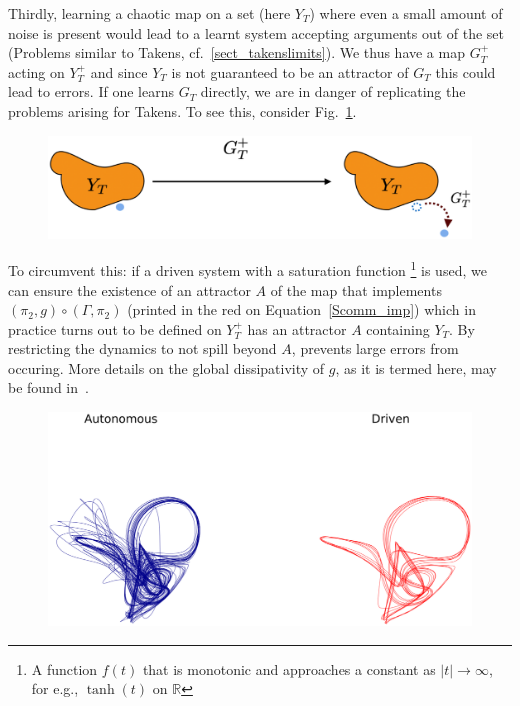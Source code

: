 
Thirdly, learning a chaotic map on a set (here $Y_T$) where even a small amount of noise is present would lead to a learnt system accepting arguments out of the set (Problems similar to Takens, cf.~\ref{sect_takenslimits}). 
We thus have a map $G_T^+$ acting on $Y_T^+$ and since $Y_T$ is not guaranteed to be an attractor of $G_T$ this could lead to errors.
If one learns $G_T$ directly, we are in danger of replicating the problems arising for Takens.  To see this, consider Fig.~\ref{fig:YtGtFailure}.

\begin{figure}[ht]
  \includegraphics[width=0.6\linewidth]{Graphs/_YTerrors.eps}
  \centering
\label{fig:YtGtFailure}
\end{figure}

To circumvent this: if a driven system with a saturation function \footnote{A function $f(t)$ that is monotonic and approaches a constant as $|t|\to \infty$, for e.g., $\tanh(t)$ on $\mathbb{R}$} is used, we can ensure the existence of an attractor $A$ of the map that implements 
$(\pi_2,g) \circ (\Gamma,\pi_2)$ (printed in the red on Equation~\ref{Scomm_imp})
 which in practice turns out to be defined on $Y_T^+$ has an attractor $A$  containing $Y_T$.
By restricting the dynamics to not spill beyond $A$, prevents large errors from occuring.  
More details on the global dissipativity of $g$, as it is termed here, may be found in~\cite{Supp}.
\begin{figure}[ht]
  \includegraphics[scale=0.25]{Graphs/_autovsdriven.eps}
  \centering
 \label{fig:learningFailure}
\end{figure}

